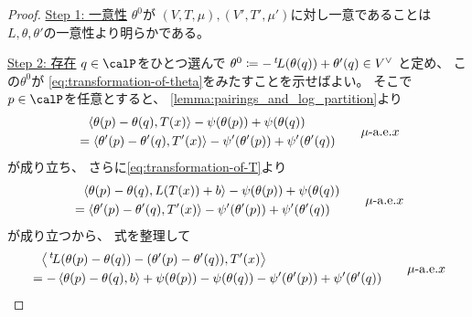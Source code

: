 \documentclass[report]{jlreq}
\begin{document}
\begin{proof}
    \uline{Step 1: 一意性} \quad
    $\theta^0$が
    $(V, T, \mu), (V', T', \mu')$に対し一意であることは
    $L, \theta, \theta'$の一意性より明らかである。

    \uline{Step 2: 存在} \quad
    $q \in \calP$をひとつ選んで
    $\theta^0
        \coloneqq
            - \,{}^{t}\!L(\theta(q)) + \theta'(q) \in V^\vee$
    と定め、
    この$\theta^0$が
    \cref{eq:transformation-of-theta}をみたすことを示せばよい。
    そこで$p \in \calP$を任意とすると、
    \cref{lemma:pairings_and_log_partition}より
    \begin{equation}
        \begin{alignedat}{1}
            &\phantom{=}
                \left\langle{\theta(p) - \theta(q)},{T(x)}\right\rangle
                - \psi(\theta(p)) + \psi(\theta(q))
                \\
            &=
                \left\langle{\theta'(p) - \theta'(q)},{T'(x)}\right\rangle
                - \psi'(\theta'(p)) + \psi'(\theta'(q))
        \end{alignedat}
        \qquad
        \text{$\mu$-a.e.$x$}
    \end{equation}
    が成り立ち、
    さらに\cref{eq:transformation-of-T}より
    \begin{equation}
        \begin{alignedat}{1}
            &\phantom{=}
                \left\langle{\theta(p) - \theta(q)},{L(T(x)) + b}\right\rangle
                - \psi(\theta(p)) + \psi(\theta(q))
                \\
            &=
                \left\langle{\theta'(p) - \theta'(q)},{T'(x)}\right\rangle
                - \psi'(\theta'(p)) + \psi'(\theta'(q))
        \end{alignedat}
        \qquad
        \text{$\mu$-a.e.$x$}
    \end{equation}
    が成り立つから、
    式を整理して
    \begin{equation}
        \begin{alignedat}{1}
            &\phantom{=}
                \left\langle{
                    \,{}^{t}\!L(\theta(p) - \theta(q))
                    - (\theta'(p) - \theta'(q))
                },{T'(x)}\right\rangle
                \\
            &=
                - \left\langle{\theta(p) - \theta(q)},{b}\right\rangle
                + \psi(\theta(p)) - \psi(\theta(q))
                - \psi'(\theta'(p)) + \psi'(\theta'(q))
        \end{alignedat}
        \qquad
        \text{$\mu$-a.e.$x$}
    \end{equation}

\end{proof}
\end{document}
